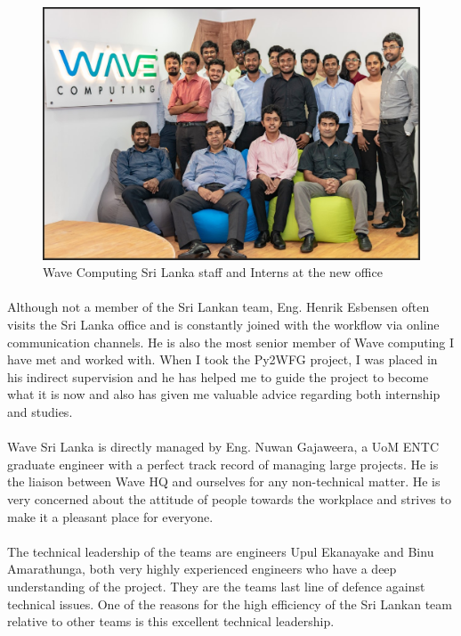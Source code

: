 \begin{figure}[H]
    \centering
    \includegraphics[trim=0cm 0cm 0cm 0cm, clip=true,scale=0.5]{figures/wave_staff.jpg}
    \caption{Wave Computing Sri Lanka staff and Interns at the new office\label{Fig:wavestaff}}\vspace{-4mm}
    \end{figure}

\paragraph{}
Although not a member of the Sri Lankan team, Eng. Henrik Esbensen often visits the Sri Lanka office and is constantly joined with the workflow via online communication channels. He is also the most senior member of Wave computing I have met and worked with. When I took the Py2WFG project, I was placed in his indirect supervision and he has helped me to guide the project to become what it is now and also has given me valuable advice regarding both internship and studies.

\paragraph{}
Wave Sri Lanka is directly managed by Eng. Nuwan Gajaweera, a UoM ENTC graduate engineer with a perfect track record of managing large projects. He is the liaison between Wave HQ and ourselves for any non-technical matter. He is very concerned about the attitude of people towards the workplace and strives to make it a pleasant place for everyone. 

\paragraph{}
The technical leadership of the teams are engineers Upul Ekanayake and Binu Amarathunga, both very highly experienced engineers who have a deep understanding of the project. They are the teams last line of defence against technical issues. One of the reasons for the high efficiency of the Sri Lankan team relative to other teams is this excellent technical leadership.

